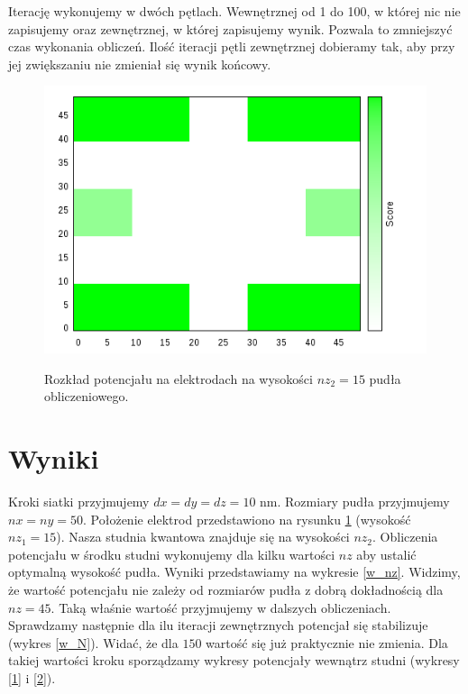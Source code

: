 \documentclass[11pt]{article}
\begin{document}
Iterację wykonujemy w dwóch pętlach. Wewnętrznej od 1 do 100, w której nic nie zapisujemy oraz zewnętrznej, w której zapisujemy wynik. Pozwala to 
zmniejszyć czas wykonania obliczeń. Ilość iteracji pętli zewnętrznej dobieramy tak, aby przy jej zwiększaniu nie zmieniał się wynik końcowy.
\begin{figure}[h]
\begin{center}
\includegraphics[scale=0.66]{ele.png}
\caption{Rozkład potencjału na elektrodach na wysokości $nz_2=15$ pudła obliczeniowego.}{\label{ele}}
\end{center}
\end{figure}
\section*{Wyniki}
Kroki siatki przyjmujemy $dx=dy=dz=10$ nm.
Rozmiary pudła przyjmujemy $nx=ny=50$. Położenie elektrod przedstawiono na rysunku \ref{ele}
(wysokość $nz_1=15$). Nasza studnia kwantowa znajduje się na wysokości $nz_2$. Obliczenia potencjału w środku studni
 wykonujemy dla kilku wartości $nz$ aby ustalić optymalną wysokość pudła. 
Wyniki przedstawiamy na wykresie \ref{w_nz}. Widzimy, że wartość potencjału nie zależy od rozmiarów pudła 
z dobrą dokładnością dla $nz=45$. Taką właśnie wartość przyjmujemy w dalszych obliczeniach. Sprawdzamy następnie dla ilu iteracji
zewnętrznych potencjał się stabilizuje (wykres \ref{w_N}). Widać, że dla $150$ wartość się już praktycznie nie zmienia. Dla takiej wartości
kroku sporządzamy wykresy potencjały wewnątrz studni (wykresy \ref{1} i \ref{2}).
\end{document}
